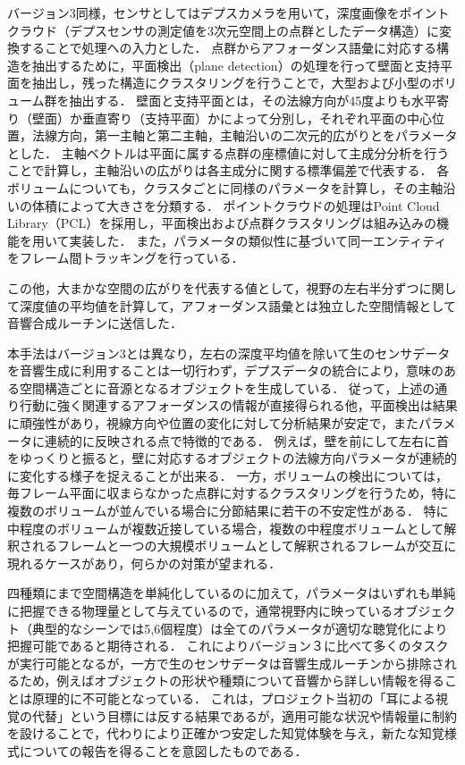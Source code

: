 バージョン3同様，センサとしてはデプスカメラを用いて，深度画像をポイントクラウド（デプスセンサの測定値を3次元空間上の点群としたデータ構造）に変換することで処理への入力とした．
点群からアフォーダンス語彙に対応する構造を抽出するために，平面検出（plane detection）の処理を行って壁面と支持平面を抽出し，残った構造にクラスタリングを行うことで，大型および小型のボリューム群を抽出する．
壁面と支持平面とは，その法線方向が45度よりも水平寄り（壁面）か垂直寄り（支持平面）かによって分別し，それぞれ平面の中心位置，法線方向，第一主軸と第二主軸，主軸沿いの二次元的広がりとをパラメータとした．
主軸ベクトルは平面に属する点群の座標値に対して主成分分析を行うことで計算し，主軸沿いの広がりは各主成分に関する標準偏差で代表する．
各ボリュームについても，クラスタごとに同様のパラメータを計算し，その主軸沿いの体積によって大きさを分類する．
ポイントクラウドの処理はPoint Cloud Library（PCL）を採用し，平面検出および点群クラスタリングは組み込みの機能を用いて実装した．
また，パラメータの類似性に基づいて同一エンティティをフレーム間トラッキングを行っている．

この他，大まかな空間の広がりを代表する値として，視野の左右半分ずつに関して深度値の平均値を計算して，アフォーダンス語彙とは独立した空間情報として音響合成ルーチンに送信した．

本手法はバージョン3とは異なり，左右の深度平均値を除いて生のセンサデータを音響生成に利用することは一切行わず，デプスデータの統合により，意味のある空間構造ごとに音源となるオブジェクトを生成している．
従って，上述の通り行動に強く関連するアフォーダンスの情報が直接得られる他，平面検出は結果に頑強性があり，視線方向や位置の変化に対して分析結果が安定で，またパラメータに連続的に反映される点で特徴的である．
例えば，壁を前にして左右に首をゆっくりと振ると，壁に対応するオブジェクトの法線方向パラメータが連続的に変化する様子を捉えることが出来る．
一方，ボリュームの検出については，毎フレーム平面に収まらなかった点群に対するクラスタリングを行うため，特に複数のボリュームが並んでいる場合に分節結果に若干の不安定性がある．
特に中程度のボリュームが複数近接している場合，複数の中程度ボリュームとして解釈されるフレームと一つの大規模ボリュームとして解釈されるフレームが交互に現れるケースがあり，何らかの対策が望まれる．

四種類にまで空間構造を単純化しているのに加えて，パラメータはいずれも単純に把握できる物理量として与えているので，通常視野内に映っているオブジェクト（典型的なシーンでは5,6個程度）は全てのパラメータが適切な聴覚化により把握可能であると期待される．
これによりバージョン３に比べて多くのタスクが実行可能となるが，一方で生のセンサデータは音響生成ルーチンから排除されるため，例えばオブジェクトの形状や種類について音響から詳しい情報を得ることは原理的に不可能となっている．
これは，プロジェクト当初の「耳による視覚の代替」という目標には反する結果であるが，適用可能な状況や情報量に制約を設けることで，代わりにより正確かつ安定した知覚体験を与え，新たな知覚様式についての報告を得ることを意図したものである．

